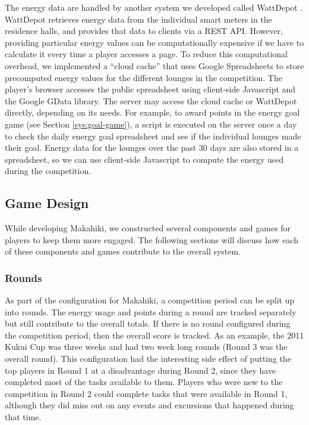 \documentclass{acm_proc_article-sp}
\begin{document}
The energy data are handled by another system we developed called WattDepot 
\cite{csdl2-10-05}. WattDepot retrieves energy data from the individual smart meters in the residence halls, and provides that data to clients via a REST API. However, providing particular energy values can be computationally expensive if we have to calculate it every time a player accesses a page. To reduce this computational overhead, we implemented a ``cloud cache'' that uses Google Spreadsheets to store precomputed energy values for the different lounges in the competition. The player's browser accesses the public spreadsheet using client-side Javascript and the Google GData library. The server may access the cloud cache or WattDepot directly, depending on its needs. For example, to award points in the energy goal game (see Section \ref{sys:goal-game}), a script is executed on the server once a day to check the daily energy goal spreadsheet and see if the individual lounges made their goal. Energy data for the lounges over the past 30 days are also stored in a spreadsheet, so we can use client-side Javascript to compute the energy used during the competition.

\subsection{Game Design}
\label{sys:GameDesign}

While developing Makahiki, we constructed several components and games for players to keep them more engaged. The following sections will discuss how each of these components and games contribute to the overall system.

\subsubsection{Rounds}

As part of the configuration for Makahiki, a competition period can be split up into rounds. The energy usage and points during a round are tracked separately but still contribute to the overall totals. If there is no round configured during the competition period, then the overall score is tracked. As an example, the 2011 Kukui Cup was three weeks and had two week long rounds (Round 3 was the overall round). This configuration had the interesting side effect of putting the top players in Round 1 at a disadvantage during Round 2, since they have completed most of the tasks available to them. Players who were new to the competition in Round 2 could complete tasks that were available in Round 1, although they did miss out on any events and excursions that happened during that time.
\end{document}
